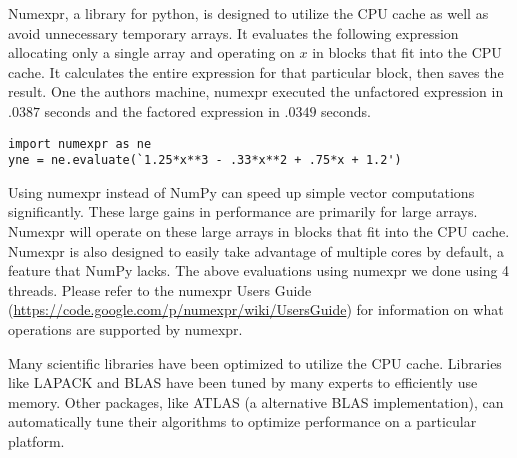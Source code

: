 Numexpr, a library for python, is designed to utilize the CPU cache as well as avoid unnecessary temporary arrays.
It evaluates the following expression allocating only a single array and operating on $x$ in blocks that fit into the CPU cache.
It calculates the entire expression for that particular block, then saves the result.
One the authors machine, numexpr executed the unfactored expression in $.0387$ seconds and the factored expression in $.0349$ seconds.
\begin{lstlisting}
import numexpr as ne
yne = ne.evaluate(`1.25*x**3 - .33*x**2 + .75*x + 1.2')
\end{lstlisting}
Using numexpr instead of NumPy can speed up simple vector computations significantly.
These large gains in performance are primarily for large arrays.
Numexpr will operate on these large arrays in blocks that fit into the CPU cache.
Numexpr is also designed to easily take advantage of multiple cores by default, a feature that NumPy lacks.
The above evaluations using numexpr we done using 4 threads.
Please refer to the numexpr Users Guide (\url{https://code.google.com/p/numexpr/wiki/UsersGuide}) for information on what operations are supported by numexpr.

Many scientific libraries have been optimized to utilize the CPU cache.
Libraries like LAPACK and BLAS have been tuned by many experts to efficiently use memory.
Other packages, like ATLAS (a alternative BLAS implementation), can automatically tune their algorithms to optimize performance on a particular platform.
